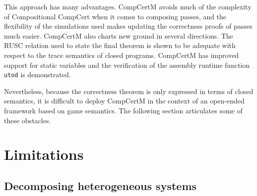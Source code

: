 \documentclass[11pt,oneside]{book}
\theoremstyle{definition}
\begin{document}
This approach has many advantages.
CompCertM avoids much of the complexity
of Compositional CompCert
when it comes to composing passes,
and the flexibility of the simulations used
makes updating the correctness proofs of passes much easier.
CompCertM also charts new ground in several directions.
The RUSC relation used to state the final theorem
is shown to be adequate with respect to the trace semantics
of closed programs.
CompCertM has improved support for static variables
and the verification of
the assembly runtime function \texttt{utod} is demonstrated.

Nevertheless,
because the correctness theorem is only expressed in terms of
closed semantics,
it is difficult to deploy CompCertM
in the context of an open-ended framework
based on game semantics.
The following section
articulates some of these obstacles.

%
%



\section{Limitations} \label{sec:compcertlim} %

\subsection{Decomposing heterogeneous systems} %
\end{document}

